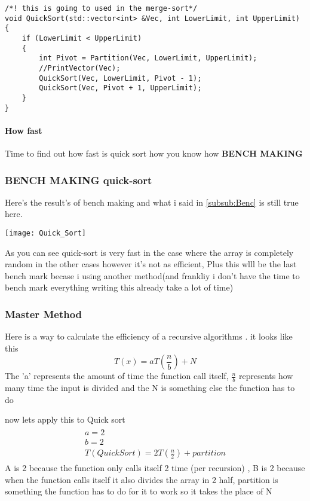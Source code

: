 \documentclass{article}
\begin{document}
\begin{lstlisting} 
/*! this is going to used in the merge-sort*/
void QuickSort(std::vector<int> &Vec, int LowerLimit, int UpperLimit)
{
	if (LowerLimit < UpperLimit)
	{
		int Pivot = Partition(Vec, LowerLimit, UpperLimit);
		//PrintVector(Vec);
		QuickSort(Vec, LowerLimit, Pivot - 1);
		QuickSort(Vec, Pivot + 1, UpperLimit);
	}
}
\end{lstlisting}
\paragraph{How fast } Time to find out how fast is quick sort how you know how \textbf{BENCH MAKING}
\subsubsection{BENCH MAKING quick-sort}
Here's the result's of bench making and what i said in \ref{subsub:Benc} is still true here.
\begin{center}
\texttt{[image: Quick\_Sort]}
\end{center}
As you can see quick-sort is very fast in the case where the array is completely random in the other cases however it's not as efficient, Plus this wlll be the last bench mark becase i using another method(and frankliy i don't have the time to bench mark everything writing this already take a lot of time) 
\subsubsection{Master Method}
Here is a way to calculate the efficiency of a recursive algorithms . it looks like this 
\begin{equation}
T(x)=aT(\frac{n}{b}) + N
\end{equation}
The 'a' represents the amount of time the function call itself,  $\frac{n}{b}$ represents how many time the input is divided and the N is something else the function has to do

now lets apply this to Quick sort 
\begin{align}
\begin{split}
a= 2 
\\
b = 2
\\
T(Quick Sort) = 2T(\frac{n}{2}) + partition
\end{split}
\end{align}
A is 2 because the function only calls itself 2 time (per recursion) , B is 2 because when the function calls itself it also divides the array in 2 half, partition is something the function has to do for it to work so it takes the place of N 
\end{document}

